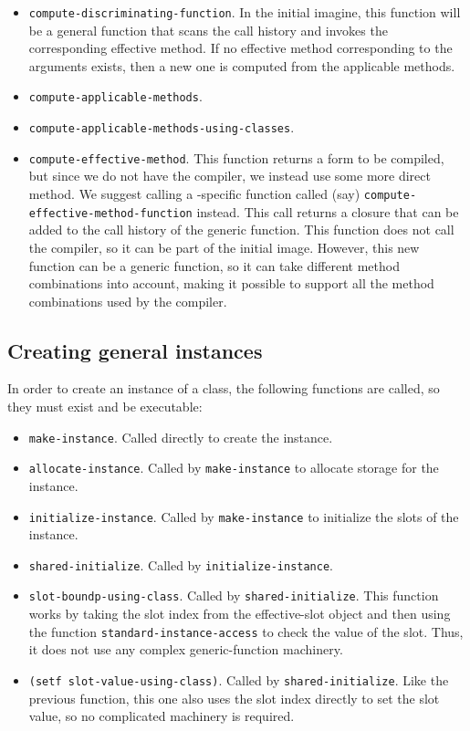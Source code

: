 \begin{itemize}
\item \texttt{compute-discriminating-function}.  In the initial
  imagine, this function will be a general function that scans the
  call history and invokes the corresponding effective method.  If no
  effective method corresponding to the arguments exists, then a new
  one is computed from the applicable methods.
\item \texttt{compute-applicable-methods}.
\item \texttt{compute-applicable-methods-using-classes}.
\item \texttt{compute-effective-method}.  This function returns a form
  to be compiled, but since we do not have the compiler, we instead
  use some more direct method.  We suggest calling a
  \sysname{}-specific function called (say)
  \texttt{compute-effective-method-function} instead.  This call
  returns a closure that can be added to the call history of the
  generic function.  This function does not call the compiler, so it
  can be part of the initial image.  However, this new function can be
  a generic function, so it can take different method combinations
  into account, making it possible to support all the method
  combinations used by the compiler.
\end{itemize}

\subsection{Creating general instances}
\label{sec-bootstrapping-creating-general-instances}

In order to create an instance of a class, the following functions
are called, so they must exist and be executable:

\begin{itemize}
\item \texttt{make-instance}.  Called directly to create the instance.
\item \texttt{allocate-instance}.  Called by \texttt{make-instance} to
  allocate storage for the instance.
\item \texttt{initialize-instance}.  Called by \texttt{make-instance}
  to initialize the slots of the instance.
\item \texttt{shared-initialize}.  Called by
  \texttt{initialize-instance}.
\item \texttt{slot-boundp-using-class}.  Called by
  \texttt{shared-initialize}.  This function works by taking the slot
  index from the effective-slot object and then using the function
  \texttt{standard-instance-access} to check the value of the slot.
  Thus, it does not use any complex generic-function machinery.
\item \texttt{(setf slot-value-using-class)}.  Called by
  \texttt{shared-initialize}.  Like the previous function, this one
  also uses the slot index directly to set the slot value, so no
  complicated machinery is required.
\end{itemize}

